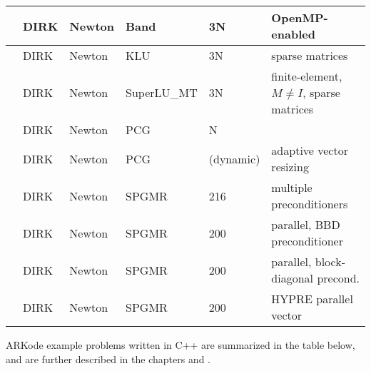 \documentclass[letterpaper,10pt,english]{sphinxmanual}
\begin{document}
\begin{savenotes}
\begin{tabulary}{\linewidth}[t]{|T|T|T|T|T|T|}
\hline
{\hyperref[\detokenize{c_openmp:ark-brusselator1d-omp}]{}}
&
DIRK
&
Newton
&
Band
&
3N
&
OpenMP-enabled
\\
\hline
{\hyperref[\detokenize{c_serial:ark-brusselator1d-klu}]{}}
&
DIRK
&
Newton
&
KLU
&
3N
&
sparse matrices
\\
\hline
{\hyperref[\detokenize{c_serial:ark-brusselator1d-fem-slu}]{}}
&
DIRK
&
Newton
&
SuperLU\_MT
&
3N
&
finite-element, \(M\ne I\), sparse matrices
\\
\hline
{\hyperref[\detokenize{c_serial:ark-heat1d}]{}}
&
DIRK
&
Newton
&
PCG
&
N
&\\
\hline
{\hyperref[\detokenize{c_serial:ark-heat1d-adapt}]{}}
&
DIRK
&
Newton
&
PCG
&
(dynamic)
&
adaptive vector resizing
\\
\hline
{\hyperref[\detokenize{c_serial:ark-krylovdemo-prec}]{}}
&
DIRK
&
Newton
&
SPGMR
&
216
&
multiple preconditioners
\\
\hline
{\hyperref[\detokenize{c_parallel:ark-diurnal-kry-bbd-p}]{}}
&
DIRK
&
Newton
&
SPGMR
&
200
&
parallel, BBD preconditioner
\\
\hline
{\hyperref[\detokenize{c_parallel:ark-diurnal-kry-p}]{}}
&
DIRK
&
Newton
&
SPGMR
&
200
&
parallel, block-diagonal precond.
\\
\hline
{\hyperref[\detokenize{c_parhyp:ark-diurnal-kry-ph}]{}}
&
DIRK
&
Newton
&
SPGMR
&
200
&
HYPRE parallel vector
\\
\hline
\end{tabulary}
\par
\sphinxattableend\end{savenotes}

ARKode example problems written in C++ are summarized in the table
below, and are further described in the chapters {\hyperref[\detokenize{cpp_serial:serial-cpp}]{}} and
{\hyperref[\detokenize{cpp_parallel:parallel-cpp}]{}}.
\end{document}
